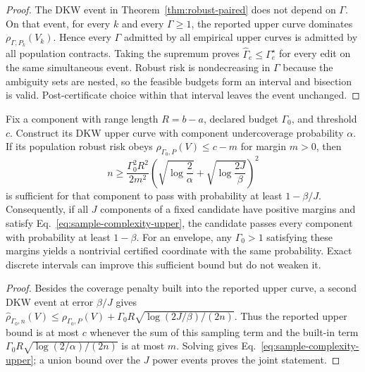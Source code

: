 \begin{proof}
The DKW event in Theorem~\ref{thm:robust-paired} does not depend on $\Gamma$.
On that event, for every $k$ and every $\Gamma\geq1$, the reported upper curve
dominates $\rho_{\Gamma,P_k}(V_k)$. Hence every $\Gamma$ admitted by all
empirical upper curves is admitted by all population contracts. Taking the
supremum proves $\widehat\Gamma_e\leq\Gamma_e^\star$ for every edit on the same
simultaneous event. Robust risk is nondecreasing in $\Gamma$ because the
ambiguity sets are nested, so the feasible budgets form an interval and
bisection is valid. Post-certificate choice within that interval leaves the
event unchanged.
\end{proof}

\begin{theorem}
\label{thm:sample-complexity-upper}
Fix a component with range length $R=b-a$, declared budget $\Gamma_0$, and
threshold $c$. Construct its DKW upper curve with component undercoverage
probability $\alpha$. If its population robust risk obeys
$\rho_{\Gamma_0,P}(V)\leq c-m$ for margin $m>0$, then
\begin{equation}
 n\geq \frac{\Gamma_0^2R^2}{2m^2}
 \left(\sqrt{\log\frac{2}{\alpha}}+
       \sqrt{\log\frac{2J}{\beta}}\right)^2
 \label{eq:sample-complexity-upper}
\end{equation}
is sufficient for that component to pass with probability at least
$1-\beta/J$. Consequently, if all $J$ components of a fixed candidate have
positive margins and satisfy Eq.~\eqref{eq:sample-complexity-upper}, the
candidate passes every component with probability at least $1-\beta$.
For an envelope, any $\Gamma_0>1$ satisfying these margins yields a nontrivial
certified coordinate with the same probability. Exact discrete intervals can
improve this sufficient bound but do not weaken it.
\end{theorem}

\begin{proof}
Besides the coverage penalty built into the reported upper curve, a second DKW
event at error $\beta/J$ gives
$\widehat\rho_{\Gamma_0,n}(V)\leq
\rho_{\Gamma_0,P}(V)+\Gamma_0R
\sqrt{\log(2J/\beta)/(2n)}$.
Thus the reported upper bound is at most $c$ whenever the sum of this sampling
term and the built-in term
$\Gamma_0R\sqrt{\log(2/\alpha)/(2n)}$ is at most $m$.
Solving gives Eq.~\eqref{eq:sample-complexity-upper}; a union bound over the
$J$ power events proves the joint statement.
\end{proof}

